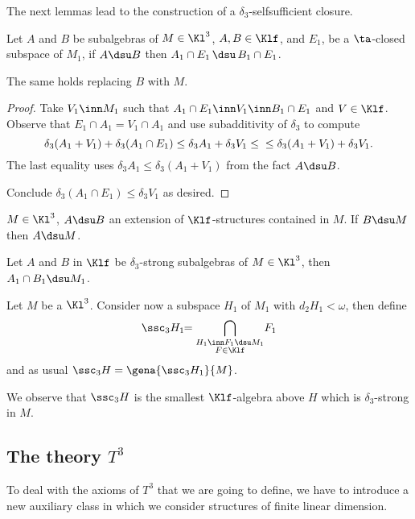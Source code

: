 The next lemmas lead to the construction of a $\delta_{3}$-selfsufficient closure.
\begin{lem}
Let $A$ and $B$ be subalgebras of $M\in\Kl^{3}$, $A,B\in\Klf$, and $E_{1}$, be a $\ta$-closed subspace of $M_{1}$,
if $A\dsu B$ then $A_{1}\cap E_{1}\,\dsu\,B_{1}\cap E_{1}$.

The same holds replacing $B$ with $M$.
\end{lem}
\begin {proof}
Take $V_{1}\inn M_{1}$ such that $A_{1}\cap E_{1}\inn V_{1}\inn B_{1}\cap E_{1}$ and $V\in\Klf$.
Observe that $E_{1}\cap A_{1}=V_{1}\cap A_{1}$ and use subadditivity of $\delta_{3}$ to compute
$$
\delta_{3}(A_{1}+V_{1})+\delta_{3}(A_{1}\cap E_{1})\leq\delta_{3}A_{1}+\delta_{3}V_{1}\leq\\
\leq\delta_{3}%
(A_{1}+V_{1})+\delta_{3}V_{1}.
$$
The last equality uses $\delta_{3}A_{1}\leq\delta_{3}(A_{1}+V_{1})$ from
the fact $A\dsu B$. %

Conclude $\delta_{3}(A_{1}\cap E_{1})\leq\delta_{3}V_{1}$ as desired.
\end{proof}
\begin{cor}
$M\in\Kl^{3}$, $A\dsu B$ an extension of $\Klf$-structures contained in $M$.
If $B\dsu M$ then $A\dsu M$.
\end{cor}
\begin{cor}
Let $A$ and $B$ in $\Klf$ be $\delta_{3}$-strong subalgebras of $M\in\Kl^{3}$,
then  $A_{1}\cap B_{1}\dsu M_{1}$.
\end{cor}

Let $M$ be a $\Kl^{3}$. Consider now a subspace $H_{1}$ of $M_{1}$ with $d_{2}H_{1}<\omega$, then define
$$\ssc_{3}H_{1}\!\!=\bigcap_{\substack{H_{1}\inn F_{1}\dsu M_{1}\\ F\in\Klf}}\!F_{1}$$
and as usual $\ssc_{3}H=\gena{\ssc_{3}H_{1}}{M}$.

We observe that $\ssc_{3}H$ is the smallest $\Klf$-algebra above $H$ which is $\delta_{3}$-strong
in $M$.

\subsection{The theory $T^{3}$}
To deal with the axioms of $T^{3}$ that we are going to define, we have to introduce a new auxiliary
class in which we consider structures of finite linear dimension.

